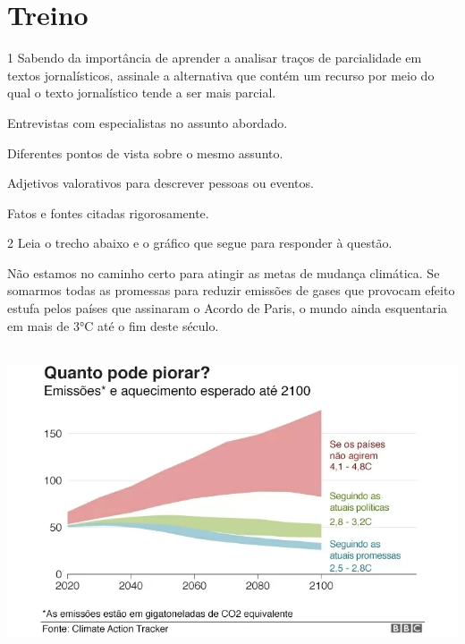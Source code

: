 {

\section{Treino}

\num{1} Sabendo da importância de aprender a analisar traços de parcialidade em
textos jornalísticos, assinale a alternativa que contém um recurso por meio
do qual o texto jornalístico tende a ser mais parcial.

\begin{escolha}

  \item Entrevistas com especialistas no assunto abordado.
  \item Diferentes pontos de vista sobre o mesmo assunto.
  \item Adjetivos valorativos para descrever pessoas ou eventos.
  \item Fatos e fontes citadas rigorosamente. 

\end{escolha}

\num{2} Leia o trecho abaixo e o gráfico que segue para responder à questão.

Não estamos no caminho certo para atingir as metas de mudança
climática. Se somarmos todas as promessas para reduzir emissões de gases
que provocam efeito estufa pelos países que assinaram o Acordo de Paris,
o mundo ainda esquentaria em mais de 3°C até o fim deste século.

\includegraphics[width=5.90551in,height=3.56944in]{./imgSAEB_7_POR/media/image8.png}

}
